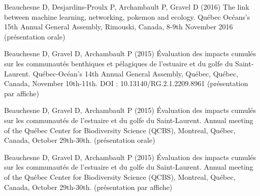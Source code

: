 \begin{singlespace}
Beauchesne D, Desjardins-Proulx P, Archambault P, Gravel D (2016) The link between machine learning, networking, pokemon and ecology. Québec Océans’s 15th Annual General Assembly, Rimouski, Canada, 8-9th November 2016 (présentation orale)

Beauchesne D, Gravel D, Archambault P (2015) Évaluation des impacts cumulés sur les communautés benthiques et pélagiques de l’estuaire et du golfe du Saint-Laurent. Québec-Océan's 14th Annual General Assembly, Québec, Québec, Canada, November 10th-11th. DOI : 10.13140/RG.2.1.2209.8961 (présentation par affiche)

Beauchesne D, Gravel D, Archambault P (2015) Évaluation des impacts cumulés sur les communautés de l’estuaire et du golfe du Saint-Laurent. Annual meeting of the Québec Center for Biodiversity Science (QCBS), Montreal, Québec, Canada, October 29th-30th. (présentation orale)

Beauchesne D, Gravel D, Archambault P (2015) Évaluation des impacts cumulés sur les communautés de l’estuaire et du golfe du Saint-Laurent. Annual meeting of the Québec Center for Biodiversity Science (QCBS), Montreal, Québec, Canada, October 29th-30th. (présentation par affiche)

\end{singlespace}
